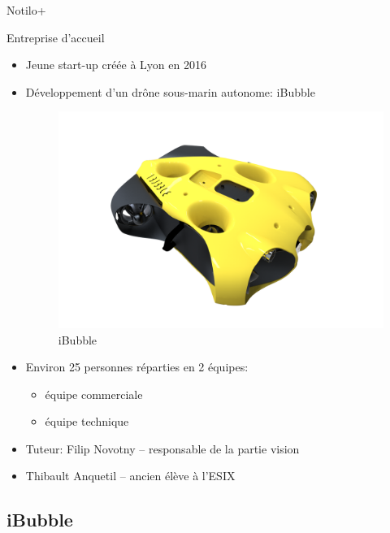 \documentclass{bredelebeamer}
\begin{document}
\begin{frame}{Notilo+}

\begin{block}{Entreprise d'accueil}
\begin{itemize}
\item Jeune start-up créée à Lyon en 2016
\item Développement d'un dr\^one sous-marin autonome: iBubble
\begin{figure}
\centering
\includegraphics[scale=0.05]{images/iBubble3.png}
\caption{iBubble}
\end{figure}
\item Environ 25 personnes réparties en 2 équipes:
	\begin{itemize}
	\item équipe commerciale
	\item équipe technique
	\end{itemize}
\item Tuteur: Filip Novotny -- responsable de la partie vision
\item Thibault Anquetil -- ancien élève à l'ESIX
\end{itemize}
\end{block}

\end{frame}



	\subsection{iBubble}
\end{document}
